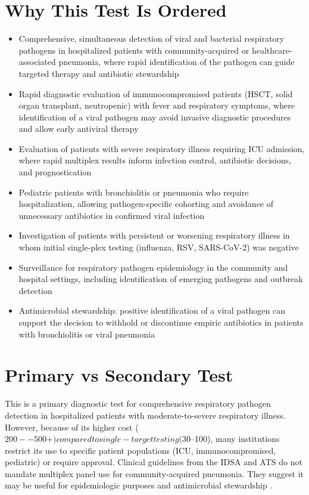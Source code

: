 \section*{Why This Test Is Ordered}
\begin{itemize}
  \item Comprehensive, simultaneous detection of viral and bacterial respiratory pathogens in hospitalized patients with community-acquired or healthcare-associated pneumonia, where rapid identification of the pathogen can guide targeted therapy and antibiotic stewardship \cite{uyeki2019clinical}
  \item Rapid diagnostic evaluation of immunocompromised patients (HSCT, solid organ transplant, neutropenic) with fever and respiratory symptoms, where identification of a viral pathogen may avoid invasive diagnostic procedures and allow early antiviral therapy
  \item Evaluation of patients with severe respiratory illness requiring ICU admission, where rapid multiplex results inform infection control, antibiotic decisions, and prognostication
  \item Pediatric patients with bronchiolitis or pneumonia who require hospitalization, allowing pathogen-specific cohorting and avoidance of unnecessary antibiotics in confirmed viral infection
  \item Investigation of patients with persistent or worsening respiratory illness in whom initial single-plex testing (influenza, RSV, SARS-CoV-2) was negative
  \item Surveillance for respiratory pathogen epidemiology in the community and hospital settings, including identification of emerging pathogens and outbreak detection
  \item Antimicrobial stewardship: positive identification of a viral pathogen can support the decision to withhold or discontinue empiric antibiotics in patients with bronchiolitis or viral pneumonia
\end{itemize}

\section*{Primary vs Secondary Test}
This is a primary diagnostic test for comprehensive respiratory pathogen detection in hospitalized patients with moderate-to-severe respiratory illness. However, because of its higher cost ($200--500+) compared to single-target testing ($30--100), many institutions restrict its use to specific patient populations (ICU, immunocompromised, pediatric) or require approval. Clinical guidelines from the IDSA and ATS do not mandate multiplex panel use for community-acquired pneumonia. They suggest it may be useful for epidemiologic purposes and antimicrobial stewardship \cite{hanson2020molecular}.

